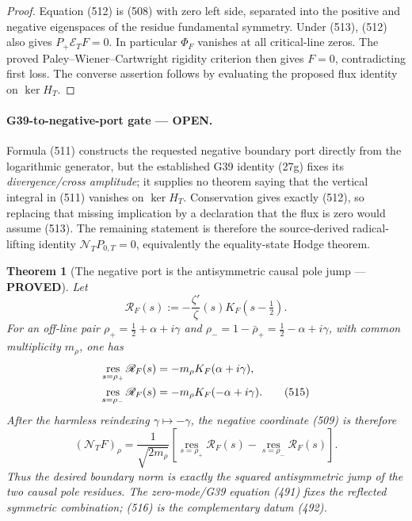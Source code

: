 \documentclass[11pt]{article}
\newtheorem{theorem}{Theorem}
\newcommand{\PROVED}{\textcolor{green!45!black}{\textbf{PROVED}}}
\newcommand{\OPEN}{\textcolor{red!70!black}{\textbf{OPEN}}}
\begin{document}
\begin{proof}
Equation (512) is (508) with zero left side, separated into the positive and
negative eigenspaces of the residue fundamental symmetry.  Under (513),
(512) also gives \(P_+\mathcal E_TF=0\).  In particular \(\Phi_F\) vanishes
at all critical-line zeros.  The proved Paley--Wiener--Cartwright rigidity
criterion then gives \(F=0\), contradicting first loss.  The converse
assertion follows by evaluating the proposed flux identity on
\(\ker H_T\).
\end{proof}

\paragraph{G39-to-negative-port gate --- \OPEN.}
Formula (511) constructs the requested negative boundary port directly from
the logarithmic generator, but the established G39 identity (27g) fixes its
\emph{divergence/cross amplitude}; it supplies no theorem saying that the
vertical integral in (511) vanishes on \(\ker H_T\).  Conservation gives
exactly (512), so replacing that missing implication by a declaration that
the flux is zero would assume (513).  The remaining statement is therefore
the source-derived radical-lifting identity
\(\mathcal N_TP_{0,T}=0\), equivalently the equality-state Hodge theorem.

\begin{theorem}[The negative port is the antisymmetric causal pole jump ---
\PROVED]
Let
\begin{equation}
 \mathscr R_F(s):=-\frac{\zeta'}{\zeta}(s)
                  K_F(s-\tfrac12).                          \tag{514}
\end{equation}
For an off-line pair
\(\rho_+=\frac12+\alpha+i\gamma\) and
\(\rho_-=1-\bar\rho_+=\frac12-\alpha+i\gamma\), with common
multiplicity \(m_\rho\), one has
\begin{align}
 \operatorname*{res}_{s=\rho_+}\mathscr R_F(s)
   &=-m_\rho K_F(\alpha+i\gamma),\notag\\
 \operatorname*{res}_{s=\rho_-}\mathscr R_F(s)
   &=-m_\rho K_F(-\alpha+i\gamma).                         \tag{515}
\end{align}
After the harmless reindexing \(\gamma\mapsto-\gamma\), the negative
coordinate (509) is therefore
\begin{equation}
 (\mathcal N_TF)_\rho
 =\frac{1}{\sqrt{2m_\rho}}\left[
  \operatorname*{res}_{s=\rho_+}\mathscr R_F(s)
 -\operatorname*{res}_{s=\rho_-}\mathscr R_F(s)\right].      \tag{516}
\end{equation}
Thus the desired boundary norm is exactly the squared antisymmetric jump of
the two causal pole residues.  The zero-mode/G39 equation (491) fixes the
reflected symmetric combination; (516) is the complementary datum (492).
\end{theorem}
\end{document}
